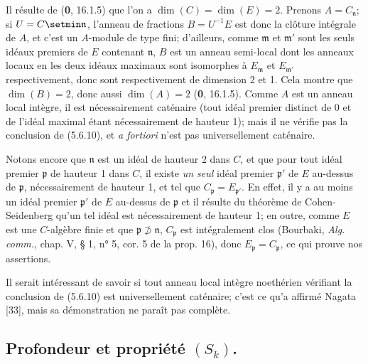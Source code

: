 \begin{example}[5.6.11]
Il résulte de (\textbf{0}, 16.1.5) que l'on a $\dim(C)=\dim(E)=2$. Prenons
$A=C_{\mathfrak n}$; si $U=C\setmin\mathfrak n$, l'anneau de fractions
$B=U^{-1}E$ est donc la clôture intégrale de $A$, et c'est un $A$-module de
type fini; d'ailleurs, comme $\mathfrak m$ et $\mathfrak m'$ sont les seuls
idéaux premiers de $E$ contenant $\mathfrak n$, $B$ est un anneau semi-local
dont les anneaux locaux en les deux idéaux maximaux sont isomorphes à
$E_{\mathfrak m}$ et $E_{\mathfrak m'}$ respectivement, donc sont
respectivement de dimension 2 et 1. Cela montre que $\dim(B)=2$, donc aussi
$\dim(A)=2$ (\textbf{0}, 16.1.5). Comme $A$ est un anneau local intègre, il est
nécessairement caténaire (tout idéal premier distinct de 0 et de l'idéal
maximal étant nécessairement de hauteur 1); mais il ne vérifie pas la
conclusion de (5.6.10), et \emph{a fortiori} n'est pas universellement
caténaire.

Notons encore que $\mathfrak n$ est un idéal de hauteur 2 dans $C$, et que
pour tout idéal premier $\mathfrak p$ de hauteur 1 dans $C$, il existe \emph{un
seul} idéal premier $\mathfrak p'$ de $E$ au-dessus de $\mathfrak p$,
nécessairement de hauteur 1, et tel que
$C_{\mathfrak p}=E_{\mathfrak p'}$. En effet, il y a au moins un idéal
premier $\mathfrak p'$ de $E$ au-dessus de $\mathfrak p$ et il résulte du
théorème de Cohen-Seidenberg qu'un
tel idéal est nécessairement de hauteur 1; en outre, comme $E$ est une
$C$-algèbre finie et que $\mathfrak p\not\supset\mathfrak n$,
$C_{\mathfrak p}$ est intégralement clos (Bourbaki, \emph{Alg. comm.},
chap. V, § 1, n° 5, cor. 5 de la prop. 16), donc
$E_{\mathfrak p}=C_{\mathfrak p}$, ce qui prouve nos assertions.

Il serait intéressant de savoir si tout anneau local intègre noethérien
vérifiant la conclusion de (5.6.10) est universellement caténaire; c'est ce
qu'a affirmé Nagata [33], mais sa démonstration ne paraît pas complète.
\end{example}

\subsection{\texorpdfstring{Profondeur et propriété $(S_k)$.}{Profondeur et propriété (S\string_k)}}

